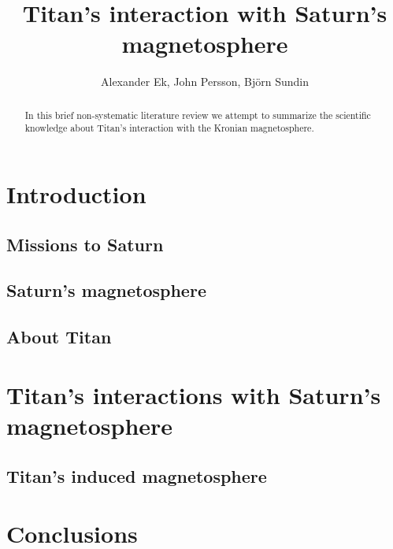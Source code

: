 \documentclass[12pt, parskip=full*, abstract]{scrartcl}
\title{Titan's interaction with Saturn's magnetosphere}
\author{Alexander Ek, John Persson, Björn Sundin}
\begin{document}
\maketitle
\vspace{5mm}
\begin{abstract}
	In this brief non-systematic literature review we attempt to summarize the scientific knowledge about Titan's interaction with the Kronian magnetosphere.
\end{abstract}

\tableofcontents
\newpage

\section{Introduction}
\subsection{Missions to Saturn}

\subsection{Saturn's magnetosphere}

\subsection{About Titan}


\section{Titan's interactions with Saturn's magnetosphere}

\subsection{Titan's induced magnetosphere}


\parencite{solar-system-magnetospheres}



\section{Conclusions}

\newpage
\printbibliography
\end{document}
